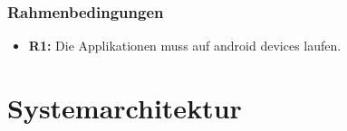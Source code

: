 \documentclass[11pt, a4paper]{article}
\begin{document}
\vspace{1cm}
\subsubsection*{Rahmenbedingungen} \vspace{.25cm}
\begin{itemize}[topsep=0pt, parsep=0pt, itemsep=10pt]
    \item \textbf{R1:} Die Applikationen muss auf android devices laufen.
\end{itemize}

\newpage
\section{Systemarchitektur}
\end{document}
